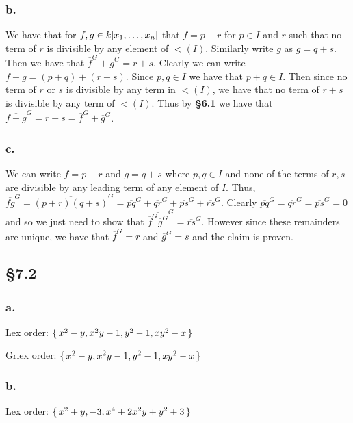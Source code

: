 \documentclass[letterpaper]{article}
\begin{document}
\subsubsection*{b.}

We have that for $f, g \in k\bqty{x_{1}, \ldots, x_{n}}$ that $f = p + r$ for $p \in I$ and $r$ such that no term of $r$ is divisible by any element of $\lt(I)$. Similarly write $g$ as $g = q + s$. Then we have that $\overline{f}^{G} + \overline{g}^{G} = r + s$. Clearly we can write $f + g = (p + q) + (r + s)$. Since $p, q \in I$ we have that $p + q \in I$. Then since no term of $r$ or $s$ is divisible by any term in $\lt(I)$, we have that no term of $r + s$ is divisible by any term of $\lt(I)$. Thus by \textbf{\S 6.1} we have that $\overline{f + g}^{G} = r + s = \overline{f}^{G} + \overline{g}^{G}$.

\subsubsection*{c.}

We can write $f = p + r$ and $g = q + s$ where $p, q \in I$ and none of the terms of $r, s$ are divisible by any leading term of any element of $I$. Thus, $\overline{fg}^G = \overline{(p + r)(q + s)}^G = \overline{pq}^G + \overline{qr}^G + \overline{ps}^G + \overline{rs}^G$. Clearly $\overline{pq}^G = \overline{qr}^G = \overline{ps}^G = 0$ and so we just need to show that $ \overline{\overline{f}^G \overline{g}^G}^G = \overline{rs}^G$. However since these remainders are unique, we have that $\overline{f}^{G} = r$ and $\overline{g}^{G} = s$ and the claim is proven.

\subsection*{\S 7.2}

\subsubsection*{a.}

Lex order: $\set{x^{2} - y, x^{2} y - 1, y^{2} - 1, x y^{2} - x}$

Grlex order: $\set{x^{2} - y, x^{2} y - 1, y^{2} - 1, x y^{2} - x}$

\subsubsection*{b.}

Lex order: $\set{x^{2} + y, -3, x^{4} + 2 x^{2} y + y^{2} + 3}$
\end{document}
